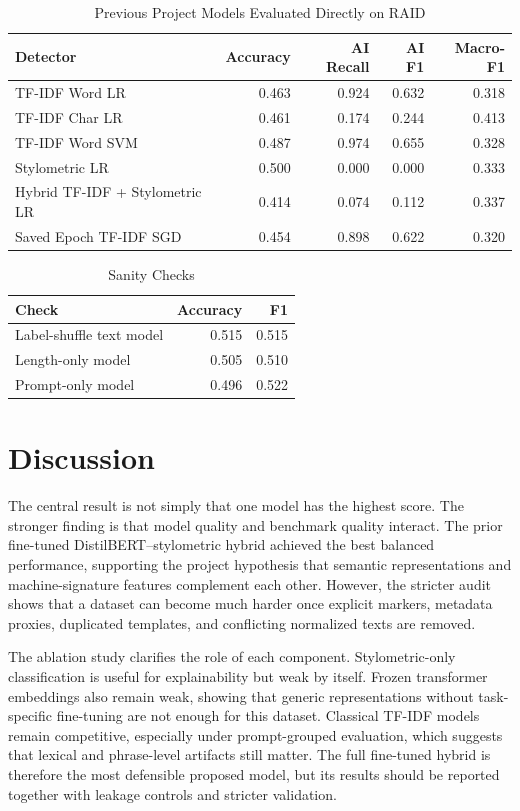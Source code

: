 \documentclass[conference]{IEEEtran}
\begin{document}
\begin{table}[htbp]
\caption{Previous Project Models Evaluated Directly on RAID}
\centering
\begin{tabular}{lrrrr}
\toprule
Detector & Accuracy & AI Recall & AI F1 & Macro-F1 \\
\midrule
TF-IDF Word LR & 0.463 & 0.924 & 0.632 & 0.318 \\
TF-IDF Char LR & 0.461 & 0.174 & 0.244 & 0.413 \\
TF-IDF Word SVM & 0.487 & 0.974 & 0.655 & 0.328 \\
Stylometric LR & 0.500 & 0.000 & 0.000 & 0.333 \\
Hybrid TF-IDF + Stylometric LR & 0.414 & 0.074 & 0.112 & 0.337 \\
Saved Epoch TF-IDF SGD & 0.454 & 0.898 & 0.622 & 0.320 \\
\bottomrule
\end{tabular}
\label{tab:previous-on-raid}
\end{table}

\begin{table}[htbp]
\caption{Sanity Checks}
\centering
\begin{tabular}{lrr}
\toprule
Check & Accuracy & F1 \\
\midrule
Label-shuffle text model & 0.515 & 0.515 \\
Length-only model & 0.505 & 0.510 \\
Prompt-only model & 0.496 & 0.522 \\
\bottomrule
\end{tabular}
\label{tab:sanity}
\end{table}

\section{Discussion}
The central result is not simply that one model has the highest score. The stronger finding is that model quality and benchmark quality interact. The prior fine-tuned DistilBERT--stylometric hybrid achieved the best balanced performance, supporting the project hypothesis that semantic representations and machine-signature features complement each other. However, the stricter audit shows that a dataset can become much harder once explicit markers, metadata proxies, duplicated templates, and conflicting normalized texts are removed.

The ablation study clarifies the role of each component. Stylometric-only classification is useful for explainability but weak by itself. Frozen transformer embeddings also remain weak, showing that generic representations without task-specific fine-tuning are not enough for this dataset. Classical TF-IDF models remain competitive, especially under prompt-grouped evaluation, which suggests that lexical and phrase-level artifacts still matter. The full fine-tuned hybrid is therefore the most defensible proposed model, but its results should be reported together with leakage controls and stricter validation.
\end{document}
